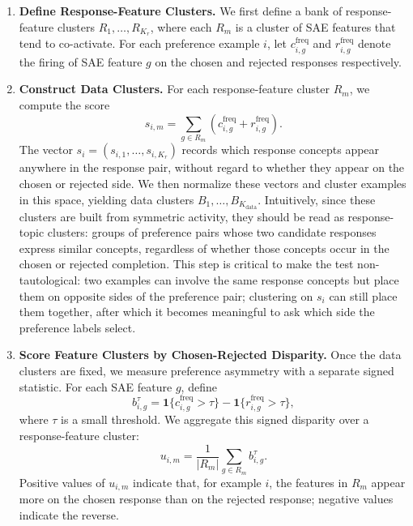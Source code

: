 \documentclass{article} %
\begin{document}
\begin{enumerate}[leftmargin=*]
\item \textbf{Define Response-Feature Clusters.} We first define a bank of response-feature clusters $R_1,\ldots,R_{K_r}$, where each $R_m$ is a cluster of SAE features that tend to co-activate. 
% 
For each preference example $i$, let $c^{\text{freq}}_{i,g}$ and $r^{\text{freq}}_{i,g}$ denote the firing of SAE feature $g$ on the chosen and rejected responses respectively.

\item \textbf{Construct Data Clusters.} For each response-feature cluster $R_m$, we compute the score
\begin{equation}
s_{i,m} = \sum_{g \in R_m} \left(c^{\text{freq}}_{i,g} + r^{\text{freq}}_{i,g}\right).
\end{equation}
The vector $s_i = (s_{i,1},\ldots,s_{i,K_r})$ records which response concepts appear anywhere in the response pair, without regard to whether they appear on the chosen or rejected side. We then normalize these vectors and cluster examples in this space, yielding data clusters $B_1,\ldots,B_{K_{\text{data}}}$.
% 
Intuitively, since these clusters are built from symmetric activity, they should be read as response-topic clusters: groups of preference pairs whose two candidate responses express similar concepts, regardless of whether those concepts occur in the chosen or rejected completion. 
% 
This step is critical to make the test non-tautological: two examples can involve the same response concepts but place them on opposite sides of the preference pair; clustering on $s_i$ can still place them together, after which it becomes meaningful to ask which side the preference labels select.


\item \textbf{Score Feature Clusters by Chosen-Rejected Disparity.} Once the data clusters are fixed, we measure preference asymmetry with a separate signed statistic. For each SAE feature $g$, define
\begin{equation}
b^\tau_{i,g} = \mathbf{1}\{c^{\text{freq}}_{i,g} > \tau\} - \mathbf{1}\{r^{\text{freq}}_{i,g} > \tau\},
\end{equation}
where $\tau$ is a small threshold. We aggregate this signed disparity over a response-feature cluster:
\begin{equation}
u_{i,m} = \frac{1}{|R_m|}\sum_{g \in R_m} b^\tau_{i,g}.
\end{equation}
Positive values of $u_{i,m}$ indicate that, for example $i$, the features in $R_m$ appear more on the chosen response than on the rejected response; negative values indicate the reverse. 


\end{enumerate}
\end{document}
